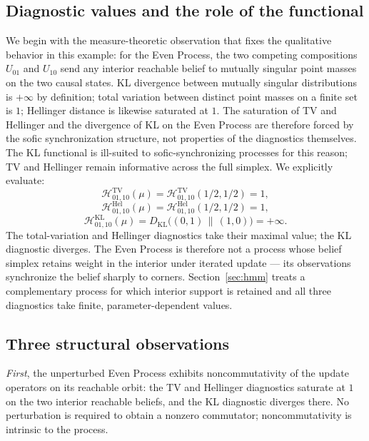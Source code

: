 \documentclass[11pt,a4paper]{article}
\theoremstyle{plain}
\theoremstyle{definition}
\theoremstyle{remark}
\newcommand{\KL}{D_{\mathrm{KL}}}
\begin{document}
\subsection{Diagnostic values and the role of the functional}

We begin with the measure-theoretic observation that fixes the qualitative behavior in this example: for the Even Process, the two competing compositions $U_{01}$ and $U_{10}$ send any interior reachable belief to mutually singular point masses on the two causal states. KL divergence between mutually singular distributions is $+\infty$ by definition; total variation between distinct point masses on a finite set is $1$; Hellinger distance is likewise saturated at $1$. The saturation of TV and Hellinger and the divergence of KL on the Even Process are therefore forced by the sofic synchronization structure, not properties of the diagnostics themselves. The KL functional is ill-suited to sofic-synchronizing processes for this reason; TV and Hellinger remain informative across the full simplex. We explicitly evaluate:
\begin{equation}
    \mathcal{H}^{\mathrm{TV}}_{01,10}(\mu) = \mathcal{H}^{\mathrm{TV}}_{01,10}(1/2, 1/2) = 1,
\end{equation}
\begin{equation}
    \mathcal{H}^{\mathrm{Hel}}_{01,10}(\mu) = \mathcal{H}^{\mathrm{Hel}}_{01,10}(1/2, 1/2) = 1,
\end{equation}
\begin{equation}
    \mathcal{H}^{\mathrm{KL}}_{01,10}(\mu) = \KL\bigl((0, 1) \,\bigl\|\, (1, 0)\bigr) = +\infty.
\end{equation}
The total-variation and Hellinger diagnostics take their maximal value; the KL diagnostic diverges. The Even Process is therefore not a process whose belief simplex retains weight in the interior under iterated update --- its observations synchronize the belief sharply to corners. Section~\ref{sec:hmm} treats a complementary process for which interior support is retained and all three diagnostics take finite, parameter-dependent values.

\subsection{Three structural observations}

\emph{First}, the unperturbed Even Process exhibits noncommutativity of the update operators on its reachable orbit: the TV and Hellinger diagnostics saturate at $1$ on the two interior reachable beliefs, and the KL diagnostic diverges there. No perturbation is required to obtain a nonzero commutator; noncommutativity is intrinsic to the process.
\end{document}
